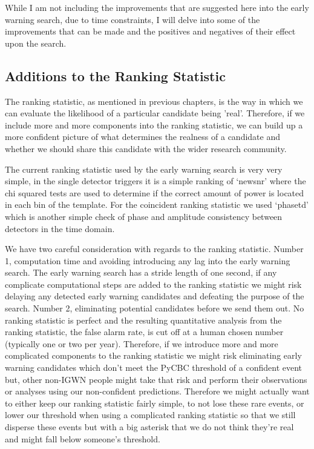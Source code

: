 While I am not including the improvements that are suggested here into the early warning search, due to time constraints, I will delve into some of the improvements that can be made and the positives and negatives of their effect upon the search.

\subsection{Additions to the Ranking Statistic}

The ranking statistic, as mentioned in previous chapters, is the way in which we can evaluate the likelihood of a particular candidate being 'real'. Therefore, if we include more and more components into the ranking statistic, we can build up a more confident picture of what determines the realness of a candidate and whether we should share this candidate with the wider research community.

The current ranking statistic used by the early warning search is very very simple, in the single detector triggers it is a simple ranking of `newsnr' where the chi squared tests are used to determine if the correct amount of power is located in each bin of the template. For the coincident ranking statistic we used `phasetd' which is another simple check of phase and amplitude consistency between detectors in the time domain.

We have two careful consideration with regards to the ranking statistic. Number 1, computation time and avoiding introducing any lag into the early warning search. The early warning search has a stride length of one second, if any complicate computational steps are added to the ranking statistic we might risk delaying any detected early warning candidates and defeating the purpose of the search. Number 2, eliminating potential candidates before we send them out. No ranking statistic is perfect and the resulting quantitative analysis from the ranking statistic, the false alarm rate, is cut off at a human chosen number (typically one or two per year). Therefore, if we introduce more and more complicated components to the ranking statistic we might risk eliminating early warning candidates which don't meet the PyCBC threshold of a confident event but, other non-IGWN people might take that risk and perform their observations or analyses using our non-confident predictions. Therefore we might actually want to either keep our ranking statistic fairly simple, to not lose these rare events, or lower our threshold when using a complicated ranking statistic so that we still disperse these events but with a big asterisk that we do not think they're real and might fall below someone's threshold.

